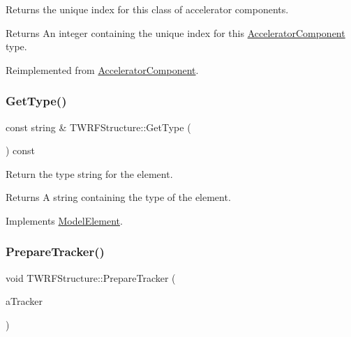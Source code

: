 Returns the unique index for this class of accelerator components. \begin{DoxyReturn}{Returns}
An integer containing the unique index for this \hyperlink{classAcceleratorComponent}{Accelerator\+Component} type. 
\end{DoxyReturn}


Reimplemented from \hyperlink{classAcceleratorComponent_abd1490171ac9af6004d3da01fb3b95fb}{Accelerator\+Component}.

\mbox{\label{classTWRFStructure_ae3eb08e80bfac82a5a1ba43ce367a71f}} 
\subsubsection{\texorpdfstring{Get\+Type()}{GetType()}}
{\footnotesize\ttfamily const string \& T\+W\+R\+F\+Structure\+::\+Get\+Type (\begin{DoxyParamCaption}{ }\end{DoxyParamCaption}) const\hspace{0.3cm}{\ttfamily [virtual]}}

Return the type string for the element. \begin{DoxyReturn}{Returns}
A string containing the type of the element. 
\end{DoxyReturn}


Implements \hyperlink{classModelElement_a04dc2e51e1999fca612eb1838ec6b271}{Model\+Element}.

\mbox{\label{classTWRFStructure_aed3f451bc33edf90177d75c5e53d94af}} 
\subsubsection{\texorpdfstring{Prepare\+Tracker()}{PrepareTracker()}}
{\footnotesize\ttfamily void T\+W\+R\+F\+Structure\+::\+Prepare\+Tracker (\begin{DoxyParamCaption}\item[{\hyperlink{classComponentTracker}{Component\+Tracker} \&}]{a\+Tracker }\end{DoxyParamCaption})\hspace{0.3cm}{\ttfamily [virtual]}}

